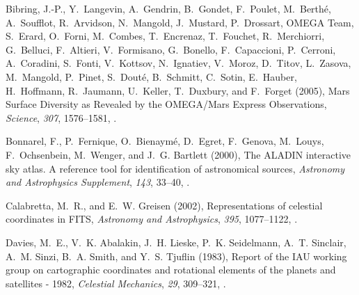\begin{thebibliography}{22}
{Bibring}, J.-P., Y.~{Langevin}, A.~{Gendrin}, B.~{Gondet}, F.~{Poulet},
  M.~{Berth{\'e}}, A.~{Soufflot}, R.~{Arvidson}, N.~{Mangold}, J.~{Mustard},
  P.~{Drossart}, {OMEGA Team}, S.~{Erard}, O.~{Forni}, M.~{Combes},
  T.~{Encrenaz}, T.~{Fouchet}, R.~{Merchiorri}, G.~{Belluci}, F.~{Altieri},
  V.~{Formisano}, G.~{Bonello}, F.~{Capaccioni}, P.~{Cerroni}, A.~{Coradini},
  S.~{Fonti}, V.~{Kottsov}, N.~{Ignatiev}, V.~{Moroz}, D.~{Titov}, L.~{Zasova},
  M.~{Mangold}, P.~{Pinet}, S.~{Dout{\'e}}, B.~{Schmitt}, C.~{Sotin},
  E.~{Hauber}, H.~{Hoffmann}, R.~{Jaumann}, U.~{Keller}, T.~{Duxbury}, and
  F.~{Forget} (2005), {Mars Surface Diversity as Revealed by the OMEGA/Mars
  Express Observations}, \textit{Science}, \textit{307}, 1576--1581,
  .

{Bonnarel}, F., P.~{Fernique}, O.~{Bienaym{\'e}}, D.~{Egret}, F.~{Genova},
  M.~{Louys}, F.~{Ochsenbein}, M.~{Wenger}, and J.~G. {Bartlett} (2000), {The
  ALADIN interactive sky atlas. A reference tool for identification of
  astronomical sources}, \textit{Astronomy and Astrophysics Supplement},
  \textit{143}, 33--40, .

{Calabretta}, M.~R., and E.~W. {Greisen} (2002), {Representations of celestial
  coordinates in FITS}, \textit{Astronomy and Astrophysics}, \textit{395},
  1077--1122, .

{Davies}, M.~E., V.~K. {Abalakin}, J.~H. {Lieske}, P.~K. {Seidelmann}, A.~T.
  {Sinclair}, A.~M. {Sinzi}, B.~A. {Smith}, and Y.~S. {Tjuflin} (1983), {Report
  of the IAU working group on cartographic coordinates and rotational elements
  of the planets and satellites - 1982}, \textit{Celestial Mechanics},
  \textit{29}, 309--321, .


\end{thebibliography}
